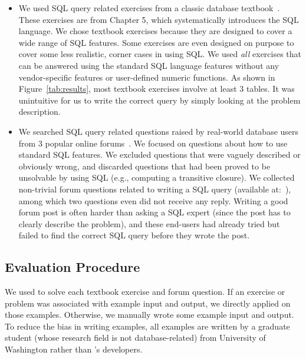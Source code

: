 \begin{itemize}
\item We used \allex SQL query related exercises
from a classic database textbook~\cite{cowbook}.
These exercises are from Chapter 5, which systematically
introduces the SQL language. We chose textbook exercises because they
are designed to
cover a wide range of SQL features. Some exercises
are even designed on purpose to cover some less realistic,
corner cases in using SQL. 
We used \textit{all} exercises that can be answered using the standard
SQL language features without any vendor-specific
features or user-defined numeric functions.
As shown in Figure~\ref{tab:results},
most textbook exercises involve at least 3 tables. It was unintuitive
for us to write the correct query by simply looking at the problem
description.

\item We searched SQL query related questions raised by real-world
database users from 3 popular online forums~\cite{stackoverflow,
tutorialized, dbjournal}.
We focused on questions about how to use standard SQL features.
We excluded questions that were vaguely described or obviously
wrong, and discarded questions that had been proved
to be unsolvable by using SQL (e.g., computing a
transitive closure).
We collected \pnum non-trivial forum questions related to writing a SQL query
(available at:~\cite{forumq}), among which
two questions even did not receive any reply.
Writing a good forum post is often harder than asking
a SQL expert (since the post has to clearly 
describe the problem), and these end-users had already tried but
failed to find the correct SQL query before they wrote the post.
\end{itemize}



\subsection{Evaluation Procedure}

We used \ourtool to solve each textbook exercise and forum
question. If an exercise or problem
was associated with example input and output,
we directly applied \ourtool on those examples.
Otherwise, we manually wrote some example input and output.
To reduce the bias in writing
examples, all examples are written by a graduate
student (whose research field is not database-related) from University of Washington rather than
\ourtool's developers.

